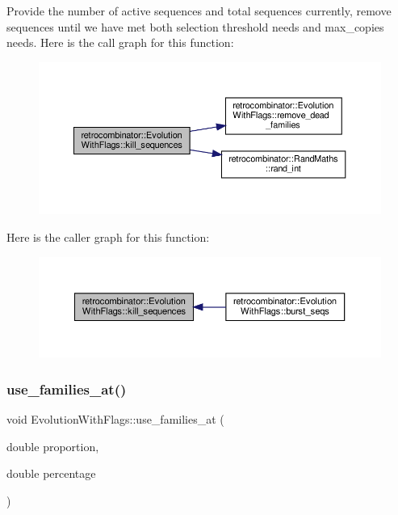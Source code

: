 Provide the number of active sequences and total sequences currently, remove sequences until we have met both selection threshold needs and max\+\_\+copies needs. Here is the call graph for this function\+:\nopagebreak
\begin{figure}[H]
\begin{center}
\leavevmode
\includegraphics[width=350pt]{classretrocombinator_1_1EvolutionWithFlags_ae5a9e278233d2ea42bdef4df66d4b5b9_cgraph}
\end{center}
\end{figure}
Here is the caller graph for this function\+:\nopagebreak
\begin{figure}[H]
\begin{center}
\leavevmode
\includegraphics[width=350pt]{classretrocombinator_1_1EvolutionWithFlags_ae5a9e278233d2ea42bdef4df66d4b5b9_icgraph}
\end{center}
\end{figure}
\mbox{\label{classretrocombinator_1_1EvolutionWithFlags_ad94cabcb6a894d503c3d84c6022a1438}} 
\subsubsection{\texorpdfstring{use\+\_\+families\+\_\+at()}{use\_families\_at()}}
{\footnotesize\ttfamily void Evolution\+With\+Flags\+::use\+\_\+families\+\_\+at (\begin{DoxyParamCaption}\item[{double}]{proportion,  }\item[{double}]{percentage }\end{DoxyParamCaption})}



